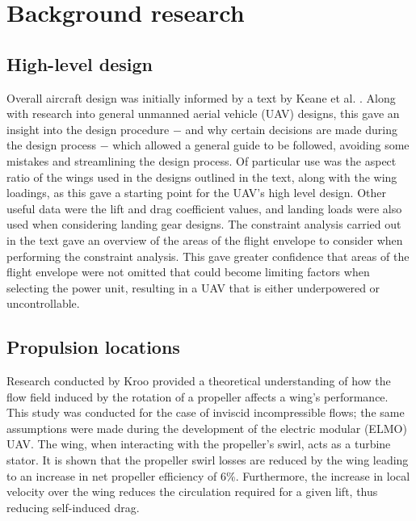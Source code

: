 \documentclass[../../main.tex]{subfiles}
\begin{document}
\section{Background research} \label{sec:introduction:background-research}

\subsection{High-level design} \label{sec:introduction:background-research:high-level-design}


Overall aircraft design was initially informed by a text by Keane et al. \cite{keane-17}.
Along with research into general unmanned aerial vehicle (UAV) designs, this gave an insight into the design procedure $-$ and why certain decisions are made during the design process $-$ which allowed a general guide to be followed, avoiding some mistakes and streamlining the design process.
Of particular use was the aspect ratio of the wings used in the designs outlined in the text, along with the wing loadings, as this gave a starting point for the UAV's high level design.
Other useful data were the lift and drag coefficient values, and landing loads were also used when considering landing gear designs.
The constraint analysis carried out in the text gave an overview of the areas of the flight envelope to consider when performing the constraint analysis.
This gave greater confidence that areas of the flight envelope were not omitted that could become limiting factors when selecting the power unit, resulting in a UAV that is either underpowered or uncontrollable.

\subsection{Propulsion locations} \label{sec:introduction:background-research:propulsion-locations}


Research conducted by Kroo \cite{kroo-86} provided a theoretical understanding of how the flow field induced by the rotation of a propeller affects a wing's performance.
This study was conducted for the case of inviscid incompressible flows; the same assumptions were made during the development of the electric modular (ELMO) UAV.
The wing, when interacting with the propeller’s swirl, acts as a turbine stator.
It is shown that the propeller swirl losses are reduced by the wing leading to an increase in net propeller efficiency of 6\%.
Furthermore, the increase in local velocity over the wing reduces the circulation required for a given lift, thus reducing self-induced drag. 
\end{document}

